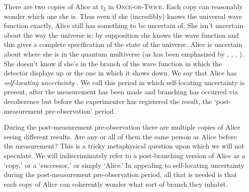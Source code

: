 \documentclass[onecolumn,secnumarabic,amsmath,amssymb,balancelastpage,nofootinbib]{article}
\begin{document}
There are two copies of Alice at $t_2$ in \textsc{Once-or-Twice}. Each copy can reasonably wonder which one she is. Thus even if she (incredibly) knows the universal wave function exactly, Alice still has something to be uncertain of.  She isn't uncertain about the way the universe is; by supposition she knows the wave function and this gives a complete specification of the state of the universe.  Alice is uncertain about where she is in the quantum multiverse (as has been emphasized by \citeauthor{vaidman1998} \citeyear{vaidman1998}, \citeyear{vaidman2011}, \citeyear{vaidman2014}, \citeyear{vaidmanSEP}).  She doesn't know if she's in the branch of the wave function in which the detector displays up or the one in which it shows down.  We say that Alice has \emph{self-locating uncertainty} \citep[see][]{lewis1979, bostrom2002}.  We call this period in which self-locating uncertainty is present, after the measurement has been made and branching has occurred via decoherence but before the experimenter has registered the result, the `post-measurement pre-observation' period.

During the post-measurement pre-observation there are multiple copies of Alice seeing different results.  Are any or all of them the same person as Alice before the measurement?  This is a tricky metaphysical question upon which we will not speculate.  We will indiscriminately refer to a post-branching version of Alice as a `copy,' or a `successor,' or simply `Alice.'  In appealing to self-locating uncertainty during the post-measurement pre-observation period, all that is needed is that each copy of Alice can coherently wonder what sort of branch they inhabit.
\end{document}

